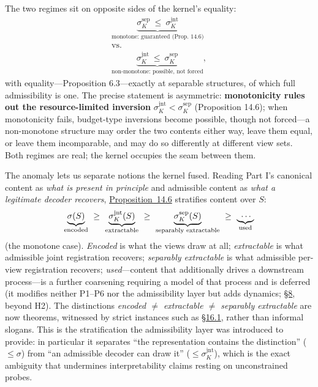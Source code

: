 The two regimes sit on opposite sides of the kernel's equality:
\[\begin{gathered}\underbrace{\sigma^{\mathrm{sep}}_K\ \le\ \sigma^{\mathrm{jnt}}_K}_{\text{monotone: guaranteed (Prop. 14.6)}} \\ \text{vs.} \\ \underbrace{\sigma^{\mathrm{jnt}}_K\ \le\ \sigma^{\mathrm{sep}}_K}_{\text{non-monotone: possible, not forced}},\end{gathered}\]
with equality---\hspace{0pt}Proposition 6.3---\hspace{0pt}exactly at separable structures, of which full admissibility is one. The precise statement is asymmetric: \textbf{monotonicity rules out the resource-limited inversion} \(\sigma^{\mathrm{jnt}}_K < \sigma^{\mathrm{sep}}_K\) (Proposition 14.6); when monotonicity fails, budget-type inversions become possible, though not forced---\hspace{0pt}a non-monotone structure may order the two contents either way, leave them equal, or leave them incomparable, and may do so differently at different view sets. Both regimes are real; the kernel occupies the seam between them.


The anomaly lets us separate notions the kernel fused. Reading Part I's canonical content as \emph{what is present in principle} and admissible content as \emph{what a legitimate decoder recovers}, \hyperlink{stmt:14.6}{Proposition~14.6} stratifies content over \(S\):
\[
\underbrace{\sigma(S)}_{\text{encoded}}\ \ge\ \underbrace{\sigma^{\mathrm{jnt}}_K(S)}_{\text{extractable}}\ \ge\ \underbrace{\sigma^{\mathrm{sep}}_K(S)}_{\text{separably extractable}}\ \ge\ \underbrace{\vphantom{\sigma^{\mathrm{jnt}}}\ \cdots\ }_{\text{used}}
\]
(the monotone case). \emph{Encoded} is what the views draw at all; \emph{extractable} is what admissible joint registration recovers; \emph{separably extractable} is what admissible per-view registration recovers; \emph{used}---\hspace{0pt}content that additionally drives a downstream process---\hspace{0pt}is a further coarsening requiring a model of that process and is deferred (it modifies neither P1--P6 nor the admissibility layer but adds dynamics; \hyperlink{sec:8}{§8}, beyond H2). The distinctions \emph{encoded \(\ne\) extractable \(\ne\) separably extractable} are now theorems, witnessed by strict instances such as \hyperlink{sec:16.1}{§16.1}, rather than informal slogans. This is the stratification the admissibility layer was introduced to provide: in particular it separates ``the representation contains the distinction'' (\(\le\sigma\)) from ``an admissible decoder can draw it'' (\(\le\sigma^{\mathrm{jnt}}_K\)), which is the exact ambiguity that undermines interpretability claims resting on unconstrained probes.

